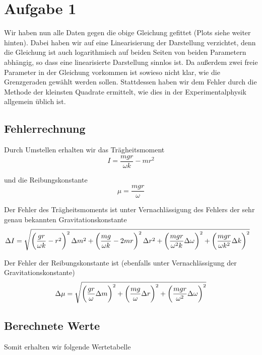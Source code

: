 \documentclass[a4paper,german,12pt,smallheadings]{scrartcl}
\begin{document}
\section*{Aufgabe 1}
Wir haben nun alle Daten gegen die obige Gleichung gefittet (Plots siehe weiter
hinten). Dabei haben wir auf eine Linearisierung der Darstellung verzichtet,
denn die Gleichung ist auch logarithmisch auf beiden Seiten von beiden
Parametern abhängig, so dass eine linearisierte Darstellung sinnlos ist. Da
außerdem zwei freie Parameter in der Gleichung vorkommen ist sowieso nicht
klar, wie die Grenzgeraden gewählt werden sollen. Stattdessen haben wir dem
Fehler durch die Methode der kleinsten Quadrate ermittelt, wie dies in der
Experimentalphysik allgemein üblich ist.

\subsection*{Fehlerrechnung}
Durch Umstellen erhalten wir das Trägheitsmoment
\begin{equation}
  I = \frac{mgr}{\omega k} - mr^2
\end{equation}

und die Reibungskonstante
\begin{equation}
  \mu = \frac{mgr}{\omega}
\end{equation}

Der Fehler des Trägheitsmoments ist unter Vernachlässigung des Fehlers der sehr
genau bekannten Gravitationskonstante %
\begin{align*}
  \Delta I
  &= \sqrt{
  \del{\frac{gr}{\omega k} - r^2}^2 \Delta m^2 +
  \del{\frac{mg}{\omega k} - 2mr}^2 \Delta r^2 +
  \del{\frac{mgr}{\omega^2k} \Delta \omega}^2 +
  \del{\frac{mgr}{\omega k^2} \Delta k}^2
  }
\end{align*}

Der Fehler der Reibungskonstante ist (ebenfalls unter Vernachlässigung der
Gravitationskonstante)
\begin{equation}
  \Delta \mu = \sqrt{
    \del{\frac{gr}{\omega} \Delta m}^2 +
    \del{\frac{mg}{\omega} \Delta r}^2 +
    \del{\frac{mgr}{\omega^2} \Delta \omega}^2
  }
\end{equation}

\subsection*{Berechnete Werte}

Somit erhalten wir folgende Wertetabelle
\end{document}
